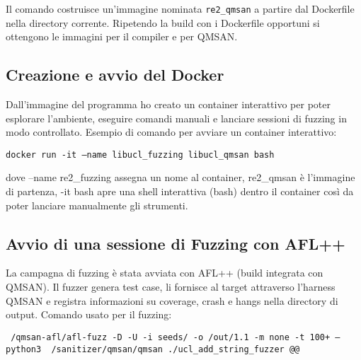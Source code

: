 Il comando costruisce un’immagine nominata \texttt{re2\_qmsan} a partire dal Dockerfile nella directory corrente. 
Ripetendo la build con i Dockerfile opportuni si ottengono le immagini per il compiler e per QMSAN.

\subsection{Creazione e avvio del Docker}

Dall’immagine del programma ho creato un container interattivo per poter esplorare l’ambiente, eseguire comandi manuali e lanciare sessioni di fuzzing in modo controllato.
Esempio di comando per avviare un container interattivo:

\begin{center}
\texttt{docker run -it --name libucl\_fuzzing\ libucl\_qmsan bash}
\end{center}

dove --name re2\_fuzzing assegna un nome al container, re2\_qmsan è l’immagine di partenza, -it bash apre una shell interattiva (bash) dentro il container così da poter lanciare manualmente gli strumenti.

\subsection{Avvio di una sessione di Fuzzing con AFL++}

La campagna di fuzzing è stata avviata con AFL++ (build integrata con QMSAN). Il fuzzer genera test case, li fornisce al target attraverso l’harness QMSAN e registra informazioni su coverage, crash e hangs nella directory di output.
Comando usato per il fuzzing:

\begin{center}
\texttt{~/qmsan-afl/afl-fuzz -D -U -i seeds/ -o /out/1.1 -m none -t 100+ -- python3 ~/sanitizer/qmsan/qmsan ./ucl\_add\_string\_fuzzer @@}
\end{center}

